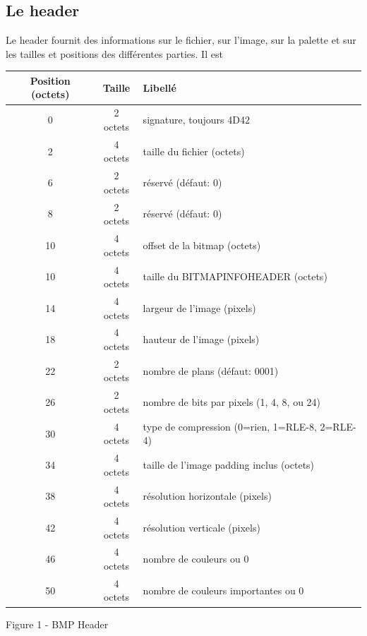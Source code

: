\documentclass{article}
\begin{document}
		\subsection{Le header}
			Le header fournit des informations sur le fichier, sur l'image, sur la palette et sur les tailles et positions des différentes parties. Il est
			\begin{center}\begin{tabular}{|c|c|l|}
				\hline \textbf{Position (octets)} & \textbf{Taille} & \textbf{Libellé}\\
				\hline 0  & 2 octets & signature, toujours 4D42\\
				\hline 2  & 4 octets & taille du fichier (octets)\\
				\hline 6  & 2 octets & réservé (défaut: 0)\\
				\hline 8  & 2 octets & réservé (défaut: 0)\\
				\hline 10 & 4 octets & offset de la bitmap (octets)\\
				\hline 10 & 4 octets & taille du BITMAPINFOHEADER (octets)\\
				\hline 14 & 4 octets & largeur de l'image (pixels)\\
				\hline 18 & 4 octets & hauteur de l'image (pixels)\\
				\hline 22 & 2 octets & nombre de plans (défaut: 0001)\\
				\hline 26 & 2 octets & nombre de bits par pixels (1, 4, 8, ou 24)\\
				\hline 30 & 4 octets & type de compression (0=rien, 1=RLE-8, 2=RLE-4)\\
				\hline 34 & 4 octets & taille de l'image padding inclus (octets)\\
				\hline 38 & 4 octets & résolution horizontale (pixels)\\
				\hline 42 & 4 octets & résolution verticale (pixels)\\
				\hline 46 & 4 octets & nombre de couleurs ou 0\\
				\hline 50 & 4 octets & nombre de couleurs importantes ou 0\\
	
				\hline
			\end{tabular}\newline\newline Figure 1 - BMP Header\end{center}
		
\end{document}
